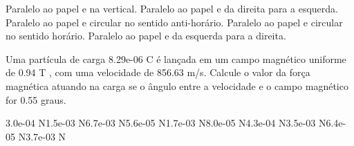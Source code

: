\documentclass[12pt, addpoints]{exam}
\begin{document}
\begin{questions}
\begin{multicols*}{2}
        

\begin{choices}
\choice Paralelo ao papel e na vertical. 
\choice Paralelo ao papel e da direita para a esquerda. 
\choice Paralelo ao papel e circular no sentido anti-horário. 
\choice Paralelo ao papel e circular no sentido horário. 
\choice Paralelo ao papel e da esquerda para a direita. 
\end{choices}
\question Uma partícula de carga 8.29e-06 C é lançada em um campo magnético uniforme de    0.94 T , com uma velocidade de 856.63 m/s. Calcule o valor da força magnética atuando na carga se o ângulo entre a velocidade e o campo magnético for    0.55 graus.

\begin{oneparchoices}
\choice 3.0e-04 N\choice 1.5e-03 N\choice 6.7e-03 N\choice 5.6e-05 N\choice 1.7e-03 N\choice 8.0e-05 N\choice 4.3e-04 N\choice 3.5e-03 N\choice 6.4e-05 N\choice 3.7e-03 N
\end{oneparchoices}\end{multicols*}
\end{questions}
\newpage
\end{document}
